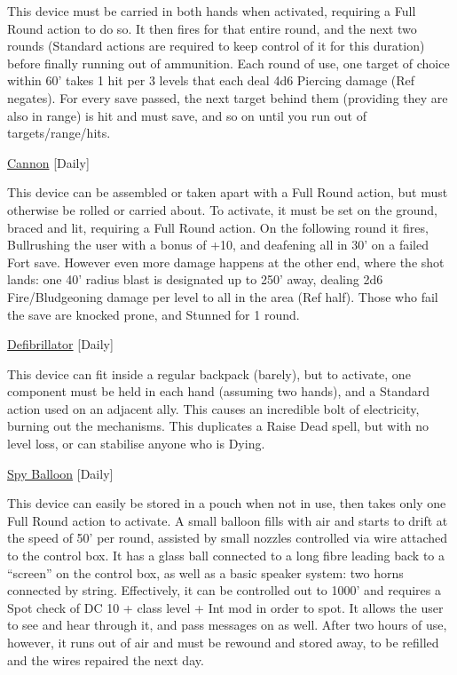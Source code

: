 \noindent This device must be carried in both hands when activated, requiring a Full Round action to do so. It then fires for that entire round, and the next two rounds (Standard actions are required to keep control of it for this duration) before finally running out of ammunition. Each round of use, one target of choice within 60' takes 1 hit per 3 levels that each deal 4d6 Piercing damage (Ref negates). For every save passed, the next target behind them (providing they are also in range) is hit and must save, and so on until you run out of targets/range/hits. 

\medskip\noindent\underline{Cannon} [Daily]
 
\noindent This device can be assembled or taken apart with a Full Round action, but must otherwise be rolled or carried about. To activate, it must be set on the ground, braced and lit, requiring a Full Round action. On the following round it fires, Bullrushing the user with a bonus of +10, and deafening all in 30' on a failed Fort save. However even more damage happens at the other end, where the shot lands: one 40' radius blast is designated up to 250' away, dealing 2d6 Fire/Bludgeoning damage per level to all in the area (Ref half). Those who fail the save are knocked prone, and Stunned for 1 round. 

\medskip\noindent\underline{Defibrillator} [Daily]
 
\noindent This device can fit inside a regular backpack (barely), but to activate, one component must be held in each hand (assuming two hands), and a Standard action used on an adjacent ally. This causes an incredible bolt of electricity, burning out the mechanisms. This duplicates a Raise Dead spell, but with no level loss, or can stabilise anyone who is Dying. 

\medskip\noindent\underline{Spy Balloon} [Daily]
 
\noindent This device can easily be stored in a pouch when not in use, then takes only one Full Round action to activate. A small balloon fills with air and starts to drift at the speed of 50' per round, assisted by small nozzles controlled via wire attached to the control box. It has a glass ball connected to a long fibre leading back to a ``screen'' on the control box, as well as a basic speaker system: two horns connected by string. Effectively, it can be controlled out to 1000' and requires a Spot check of DC 10 + class level + Int mod in order to spot. It allows the user to see and hear through it, and pass messages on as well. After two hours of use, however, it runs out of air and must be rewound and stored away, to be refilled and the wires repaired the next day. 

